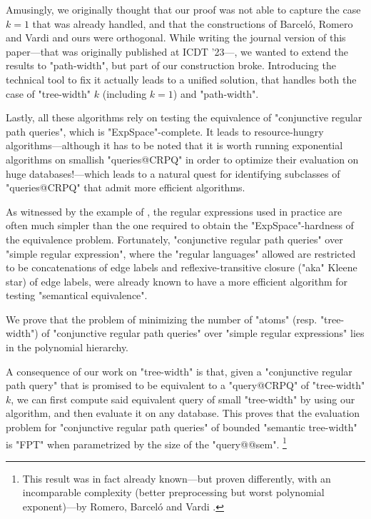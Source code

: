 Amusingly, we originally thought that our proof was not able to
capture the case $k=1$ that was already handled, and that the constructions
of Barceló, Romero and Vardi and ours were orthogonal.
While writing the journal version of this paper---that was originally
published at ICDT '23---, we wanted to extend the results to "path-width",%
but part of our construction broke. Introducing the technical tool
to fix it%
actually leads to a unified solution, that handles both
the case of "tree-width" $k$ (including $k=1$) and "path-width".%

Lastly, all these algorithms rely on testing the equivalence
of "conjunctive regular path queries", which is "ExpSpace"-complete.
It leads to resource-hungry algorithms---although it has to be noted that it is
worth running exponential algorithms on smallish "queries@CRPQ" in order to optimize
their evaluation on huge databases!---which leads to a natural quest
for identifying subclasses of "queries@CRPQ" that admit more efficient algorithms.

As witnessed by the example of , the regular expressions
used in practice are often much simpler than the one required
to obtain the "ExpSpace"-hardness of the equivalence problem.
Fortunately, "conjunctive regular path queries" over "simple regular expression",
where the "regular languages" allowed are restricted to be concatenations of
edge labels and reflexive-transitive closure ("aka" Kleene star) of
edge labels, were already known to have a more efficient
algorithm for testing "semantical equivalence".

\begin{contribution}
	We prove that the problem of minimizing the number of "atoms" (resp. "tree-width")
	of "conjunctive regular path queries" over "simple regular expressions"
	lies in the polynomial hierarchy.
\end{contribution}

A consequence of our work on "tree-width" is that,
given a "conjunctive regular path query" that is promised to be equivalent
to a "query@CRPQ" of "tree-width" $k$, we can first compute said
equivalent query of small "tree-width" by using our algorithm,
and then evaluate it on any database. This proves that the evaluation
problem for "conjunctive regular path queries" of bounded "semantic tree-width"
is "FPT" when parametrized by the size of the "query@@sem".%
\footnote{This result was in fact already known---but proven differently, with
an incomparable complexity (better preprocessing but worst polynomial exponent)---by
Romero, Barceló and Vardi \cite{RomeroBarceloVardi2017Homomorphism}.}


